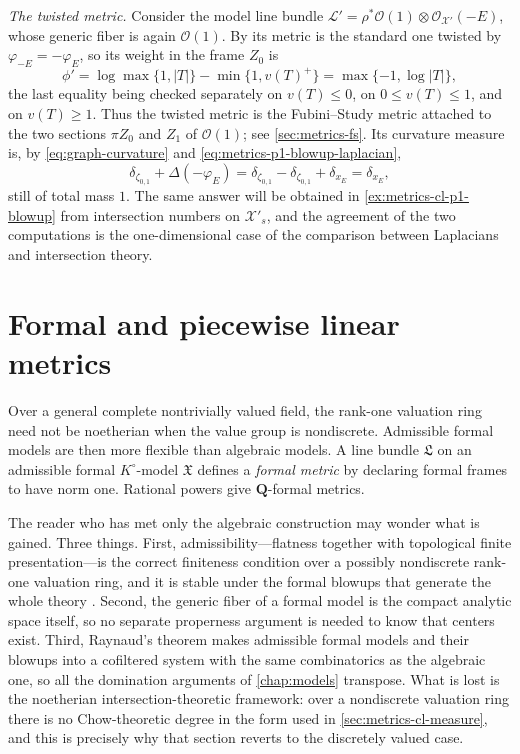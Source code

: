 \begin{example}
\emph{The twisted metric.} Consider the model line bundle
$\mathcal L'=\rho^*\mathcal O(1)\otimes\mathcal O_{\mathcal X'}(-E)$, whose
generic fiber is again $\mathcal O(1)$. By
 its metric is the standard one twisted
by $\varphi_{-E}=-\varphi_E$, so its weight in the frame $Z_0$ is
\[
 \phi'=\log\max\{1,|T|\}-\min\{1,v(T)^+\}
 =\max\{-1,\log|T|\},
\]
the last equality being checked separately on $v(T)\le0$, on
$0\le v(T)\le1$, and on $v(T)\ge1$. Thus the twisted metric is the
Fubini--Study metric attached to the two sections $\pi Z_0$ and $Z_1$
of $\mathcal O(1)$; see \cref{sec:metrics-fs}. Its curvature measure is,
by \eqref{eq:graph-curvature} and
\eqref{eq:metrics-p1-blowup-laplacian},
\[
 \delta_{\zeta_{0,1}}+\Delta(-\varphi_E)
 =\delta_{\zeta_{0,1}}-\delta_{\zeta_{0,1}}+\delta_{x_E}
 =\delta_{x_E},
\]
still of total mass $1$. The same answer will be obtained in
\cref{ex:metrics-cl-p1-blowup} from intersection numbers on
$\mathcal X'_s$, and the agreement of the two computations is the
one-dimensional case of the comparison between Laplacians and intersection
theory.
\end{example}

\section{Formal and piecewise linear metrics}
\label{sec:metrics-formal-pl}

Over a general complete nontrivially valued field, the rank-one valuation
ring need not be noetherian when the value group is nondiscrete. Admissible
formal models are then more flexible than
algebraic models. A line bundle $\mathfrak L$ on an admissible formal
$K^\circ$-model $\mathfrak X$ defines a \emph{formal metric} by declaring
formal frames to have norm one. Rational powers give
$\mathbf Q$-formal metrics.

The reader who has met only the algebraic construction may wonder what is
gained. Three things. First, admissibility---flatness together with
topological finite presentation---is the correct finiteness condition over a
possibly nondiscrete rank-one valuation ring, and it is stable under the formal blowups
that generate the whole theory \cite{BoschLutkebohmert1993}. Second, the
generic fiber of a formal model is the compact analytic space itself, so no
separate properness argument is needed to know that centers exist. Third,
Raynaud's theorem makes admissible formal models and their blowups into a
cofiltered system with the same combinatorics as the algebraic one, so all
the domination arguments of \cref{chap:models} transpose. What is lost is
the noetherian intersection-theoretic framework: over a nondiscrete
valuation ring there is no Chow-theoretic degree in the form used in
\cref{sec:metrics-cl-measure}, and
this is precisely why that section reverts to the discretely valued case.

